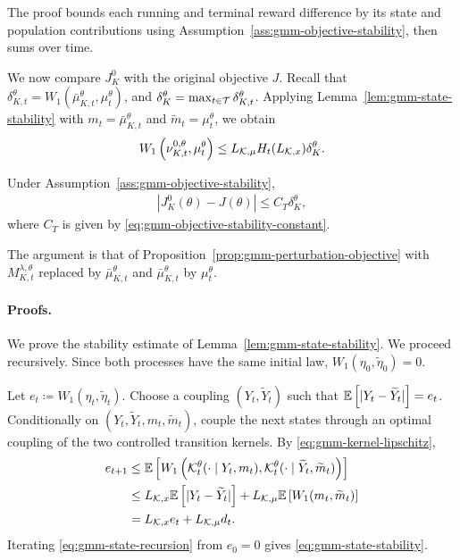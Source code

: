 The proof bounds each running and terminal reward difference by its state and population contributions using Assumption~\ref{ass:gmm-objective-stability}, then sums over time.

We now compare $J_K^0$ with the original objective $J$. Recall that $\delta_{K,t}^\theta = W_1 \left( \bar\mu_{K,t}^\theta, \mu_t^\theta \right)$, and $\delta_K^\theta = \max_{t\in{\cal T}} \delta_{K,t}^\theta$. Applying Lemma~\ref{lem:gmm-state-stability} with $m_t=\bar\mu_{K,t}^\theta$ and $\widetilde m_t=\mu_t^\theta$, we obtain
\begin{align}
    W_1 \left( \nu_{K,t}^{0,\theta}, \mu_t^\theta \right) \leq L_{{\cal K},\mu} H_t(L_{{\cal K},x}) \delta_K^\theta.
    \label{eq:gmm-representation-state-error}
\end{align}

\begin{proposition}
    \label{prop:gmm-representation-objective}
    Under Assumption~\ref{ass:gmm-objective-stability},
    \begin{align}
        \left| J_K^0(\theta) - J(\theta) \right| \leq C_T\delta_K^\theta,
        \label{eq:gmm-representation-objective-bound}
    \end{align} where $C_T$ is given by \eqref{eq:gmm-objective-stability-constant}.
\end{proposition}

The argument is that of Proposition~\ref{prop:gmm-perturbation-objective} with $M_{K,t}^{\lambda,\theta}$ replaced by $\bar\mu_{K,t}^\theta$ and $\bar\mu_{K,t}^\theta$ by $\mu_t^\theta$.

\paragraph{Proofs.}
We prove the stability estimate of Lemma~\ref{lem:gmm-state-stability}.
We proceed recursively. Since both processes have the same initial law, $W_1(\eta_0,\widetilde\eta_0)=0$.

Let $e_t\coloneqq W_1(\eta_t,\widetilde\eta_t)$. Choose a coupling $(Y_t,\widetilde Y_t)$ such that $\mathbb{E}\left[|Y_t-\widetilde Y_t|\right]=e_t$. Conditionally on $(Y_t,\widetilde Y_t,m_t,\widetilde m_t)$, couple the next states through an optimal coupling of the two controlled transition kernels. By \eqref{eq:gmm-kernel-lipschitz},
\begin{align}
    \label{eq:gmm-state-recursion}
    e_{t+1}&\leq\mathbb{E}\left[W_1\left({\cal K}_t^\theta(\cdot\mid Y_t,m_t),{\cal K}_t^\theta(\cdot\mid \widetilde Y_t,\widetilde m_t)\right)\right]\\
    &\leq L_{{\cal K},x}\mathbb{E}\left[|Y_t-\widetilde Y_t|\right] +L_{{\cal K},\mu}\mathbb{E}\left[W_1(m_t,\widetilde m_t)\right]\\
    &= L_{{\cal K},x}e_t + L_{{\cal K},\mu}d_t.
\end{align}
Iterating \eqref{eq:gmm-state-recursion} from $e_0=0$ gives \eqref{eq:gmm-state-stability}.

